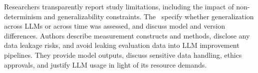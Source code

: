 Researchers \must transparently report study limitations, including the impact of non-determinism and generalizability constraints. The \paper~\must specify whether generalization across LLMs or across time was assessed, and discuss model and version differences. Authors \must describe measurement constructs and methods, disclose any data leakage risks, and avoid leaking evaluation data into LLM improvement pipelines. They \must provide model outputs, discuss sensitive data handling, ethics approvals, and justify LLM usage in light of its resource demands.